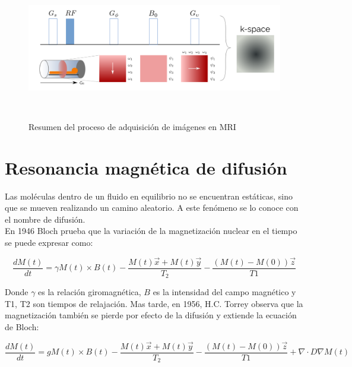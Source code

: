 \begin{figure}[h!]
                                                                                                                        
\begin{minipage}[b]{\textwidth}
    \includegraphics[width=\textwidth]{img/kspace.png}
    \caption{Resumen del proceso de adquisici\'on de im\'agenes en MRI}
    \label{fig:kspace}
\end{minipage} ~

\end{figure}  



\section{Resonancia magn\'etica de difusi\'on}

Las mol\'eculas dentro de un fluido en equilibrio no se encuentran est\'aticas,
sino que se mueven realizando un camino aleatorio. A este fen\'omeno se lo 
conoce con el nombre de difusi\'on.  \\

En 1946 Bloch \cite{Bloch1946} prueba que la variaci\'on de la magnetizaci\'on
nuclear en el tiempo se puede expresar como:

$$ \frac{dM(t)}{dt} = \gamma M(t) \times B(t) 
                      - \frac{M(t) \vec{x} + M(t)\vec{y}}{T_2}
                      - \frac{(M(t)-M(0))\vec{z}}{T1} $$

Donde $\gamma$ es la relaci\'on giromagn\'etica, $B$ es la intensidad del campo
magn\'etico y T1, T2 son tiempos de relajaci\'on. Mas tarde, en 1956, H.C. Torrey \cite{Torrey1956}
observa que la magnetizaci\'on tambi\'en se pierde por efecto de la difusi\'on y 
extiende la ecuaci\'on de Bloch:

$$ \frac{dM(t)}{dt} = g M(t) \times B(t) 
                      - \frac{M(t) \vec{x} + M(t)\vec{y}}{T_2}
                      - \frac{(M(t)-M(0))\vec{z}}{T1} 
                      + \nabla \cdot D \nabla M(t) $$

